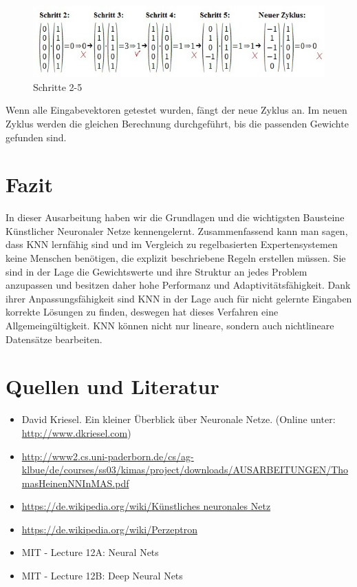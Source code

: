 \begin{figure}[h]
\centering
\includegraphics[width=12cm]{chapters/neural_networks/schritte.jpg}

\caption{Schritte 2-5}
	\label{img:einlagiges Perzeptron}

\end{figure}

Wenn alle Eingabevektoren getestet wurden, fängt der neue Zyklus an. Im neuen Zyklus werden die gleichen Berechnung durchgeführt, bis die passenden Gewichte gefunden sind.


\section{Fazit}

In dieser Ausarbeitung haben wir die Grundlagen und die wichtigsten Bausteine Künstlicher Neuronaler Netze kennengelernt. Zusammenfassend kann man sagen, dass KNN lernfähig sind und im Vergleich zu regelbasierten Expertensystemen keine Menschen  benötigen, die explizit beschriebene Regeln erstellen müssen. Sie sind in der Lage die Gewichtswerte und ihre Struktur an jedes Problem anzupassen und besitzen daher hohe Performanz und Adaptivitätsfähigkeit. Dank ihrer Anpassungsfähigkeit sind KNN in der Lage auch für nicht gelernte Eingaben korrekte Lösungen zu finden, deswegen hat dieses Verfahren eine Allgemeingültigkeit. KNN können nicht nur lineare, sondern auch nichtlineare Datensätze bearbeiten.

\section{Quellen und Literatur}
\begin{itemize}
\item David Kriesel. Ein kleiner Überblick über Neuronale Netze. (Online unter: \url{http://www.dkriesel.com})
\item \url{http://www2.cs.uni-paderborn.de/cs/ag-klbue/de/courses/ss03/kimas/project/downloads/AUSARBEITUNGEN/ThomasHeinenNNInMAS.pdf}
\item \url{https://de.wikipedia.org/wiki/Künstliches neuronales Netz}
\item \url{https://de.wikipedia.org/wiki/Perzeptron}
\item MIT - Lecture 12A: Neural Nets
\item MIT - Lecture 12B: Deep Neural Nets
\end{itemize}
